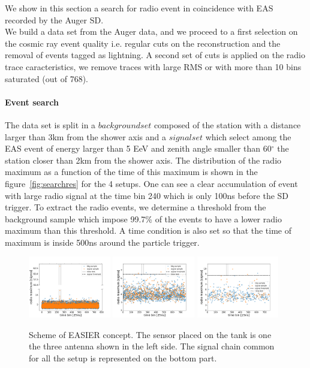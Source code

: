 \documentclass{PoS}
\begin{document}
We show in this section a search for radio event in coincidence with EAS recorded by the Auger SD.\\We build a data set from the Auger data, and we proceed to a first selection on the cosmic ray event quality i.e. regular cuts on the reconstruction and the removal of events tagged as lightning. A second set of cuts is applied on the radio trace caracteristics, we remove traces with large RMS or with more than 10 bins saturated (out of 768). 

\paragraph{Event search}
The data set is split in a $background set$ composed of the station with a distance larger than 3km from the shower axis and a $signal set$ which select among the EAS event of energy larger than 5 EeV and zenith angle smaller than 60$^{\circ}$ the station closer than 2km from the shower axis. The distribution of the radio maximum as a function of the time of this maximum is shown in the figure~\ref{fig:searchres} for the 4 setups. One can see a clear accumulation of event with large radio signal at the time bin 240 which is only 100ns before the SD trigger. To extract the radio events, we determine a threshold from the background sample which impose 99.7\% of the events to have a lower radio maximum than this threshold. A time condition is also set so that the time of maximum is inside 500ns around the particle trigger.
\begin{figure}[h]
\centering
\includegraphics[width=0.32\textwidth]{EA61_event.png}
\includegraphics[width=0.32\textwidth]{GDC_event.png}
\includegraphics[width=0.32\textwidth]{GDL_event.png}
\caption{Scheme of EASIER concept. The sensor  placed on the tank is one the three antenna shown in the left side. The signal chain common for all the setup is represented on the bottom part.}
\label{fig:eventsearch}
\end{figure}
\end{document}
